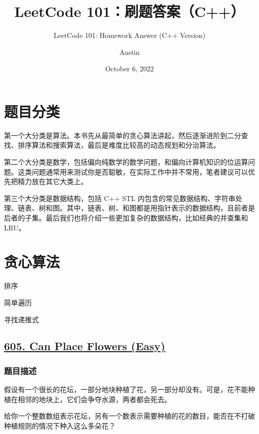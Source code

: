 \documentclass[lang=cn,10pt]{elegantbook}
\title{LeetCode 101：刷题答案（C++）}
\subtitle{LeetCode 101: Homework Answer (C++ Version)}
\author{Austin}
\institute{USTC}
\date{October 6, 2022}
\begin{document}
	
\maketitle
\frontmatter
	
\tableofcontents
	
\mainmatter
	
\chapter{题目分类}

第一个大分类是算法。本书先从最简单的贪心算法讲起，然后逐渐进阶到二分查找、排序算法和搜索算法，最后是难度比较高的动态规划和分治算法。

第二个大分类是数学，包括偏向纯数学的数学问题，和偏向计算机知识的位运算问题。这类问题通常用来测试你是否聪敏，在实际工作中并不常用，笔者建议可以优先把精力放在其它大类上。

第三个大分类是数据结构，包括 C++ STL 内包含的常见数据结构、字符串处理、链表、树和图。其中，链表、树、和图都是用指针表示的数据结构，且前者是后者的子集。最后我们也将介绍一些更加复杂的数据结构，比如经典的并查集和 LRU。

\chapter{贪心算法}

\begin{introduction}[前情提要]
	\item 排序
	\item 简单遍历
	\item 寻找递推式
\end{introduction}

{\color{red}\section{\href{https://leetcode.cn/problems/can-place-flowers/}{605. Can Place Flowers (Easy)}}} \label{Ch2.605}

\subsection*{题目描述}

假设有一个很长的花坛，一部分地块种植了花，另一部分却没有。可是，花不能种植在相邻的地块上，它们会争夺水源，两者都会死去。

给你一个整数数组表示花坛，另有一个数表示需要种植的花的数目，能否在不打破种植规则的情况下种入这么多朵花？
\end{document}
